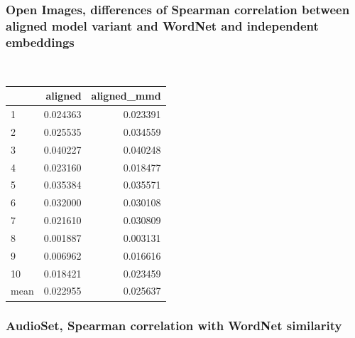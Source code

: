 \subsubsection{Open Images, differences of Spearman correlation between aligned model variant and WordNet and independent embeddings} \\

\begin{tabular}{lrr}
\toprule
{} &   aligned &  aligned\_mmd \\
\midrule
1    &  0.024363 &     0.023391 \\
2    &  0.025535 &     0.034559 \\
3    &  0.040227 &     0.040248 \\
4    &  0.023160 &     0.018477 \\
5    &  0.035384 &     0.035571 \\
6    &  0.032000 &     0.030108 \\
7    &  0.021610 &     0.030809 \\
8    &  0.001887 &     0.003131 \\
9    &  0.006962 &     0.016616 \\
10   &  0.018421 &     0.023459 \\
\midrule
mean &  0.022955 &     0.025637 \\
\bottomrule
\end{tabular}


\subsubsection{AudioSet, Spearman correlation with WordNet similarity}

